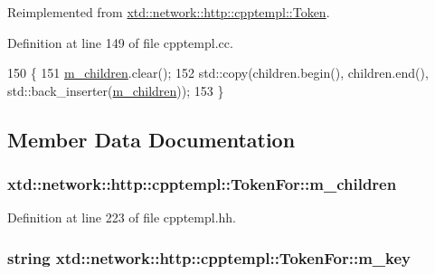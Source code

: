 Reimplemented from \hyperlink{classxtd_1_1network_1_1http_1_1cpptempl_1_1Token_adc8822088b8b9a148b755bc25cd1df6e}{xtd\+::network\+::http\+::cpptempl\+::\+Token}.



Definition at line 149 of file cpptempl.\+cc.


\begin{DoxyCode}
150 \{
151   \hyperlink{classxtd_1_1network_1_1http_1_1cpptempl_1_1TokenFor_a2ee55240eafb3c90b7a0c96c0ad253a5}{m\_children}.clear();
152   std::copy(children.begin(), children.end(), std::back\_inserter(\hyperlink{classxtd_1_1network_1_1http_1_1cpptempl_1_1TokenFor_a2ee55240eafb3c90b7a0c96c0ad253a5}{m\_children}));
153 \}
\end{DoxyCode}


\subsection{Member Data Documentation}
\subsubsection[{\texorpdfstring{m\+\_\+children}{m_children}}]{ xtd\+::network\+::http\+::cpptempl\+::\+Token\+For\+::m\+\_\+children}\hypertarget{classxtd_1_1network_1_1http_1_1cpptempl_1_1TokenFor_a2ee55240eafb3c90b7a0c96c0ad253a5}{}\label{classxtd_1_1network_1_1http_1_1cpptempl_1_1TokenFor_a2ee55240eafb3c90b7a0c96c0ad253a5}


Definition at line 223 of file cpptempl.\+hh.

\subsubsection[{\texorpdfstring{m\+\_\+key}{m_key}}]{\setlength{\rightskip}{0pt plus 5cm}string xtd\+::network\+::http\+::cpptempl\+::\+Token\+For\+::m\+\_\+key}\hypertarget{classxtd_1_1network_1_1http_1_1cpptempl_1_1TokenFor_a30879f48f3ad6e5e61f6191a702743e4}{}\label{classxtd_1_1network_1_1http_1_1cpptempl_1_1TokenFor_a30879f48f3ad6e5e61f6191a702743e4}


